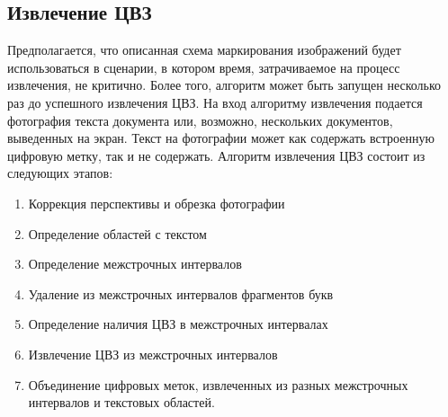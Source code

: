 \documentclass[12pt,a4paper]{article}
\begin{document}
\subsection{Извлечение ЦВЗ}
Предполагается, что описанная схема маркирования изображений будет использоваться в сценарии, в котором время, затрачиваемое на процесс извлечения, не критично.
Более того, алгоритм может быть запущен несколько раз до успешного извлечения ЦВЗ.
На вход алгоритму извлечения подается фотография текста документа или, возможно, нескольких документов, выведенных на экран.
Текст на фотографии может как содержать встроенную цифровую метку, так и не содержать.
Алгоритм извлечения ЦВЗ состоит из следующих этапов:
\begin{enumerate}
\item
Коррекция перспективы и обрезка фотографии
\item
Определение областей с текстом
\item
Определение межстрочных интервалов
\item
Удаление из межстрочных интервалов фрагментов букв
\item
Определение наличия ЦВЗ в межстрочных интервалах
\item
Извлечение ЦВЗ из межстрочных интервалов
\item
Объединение цифровых меток, извлеченных из разных межстрочных интервалов и текстовых областей.
\end{enumerate}
\end{document}
